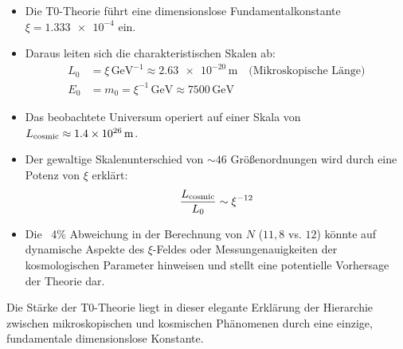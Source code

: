 \documentclass[12pt,a4paper]{article}
\begin{document}
	\begin{itemize}
		\item Die T0-Theorie führt eine dimensionslose Fundamentalkonstante $\xi = \num{1,333e-4}$ ein.
		\item Daraus leiten sich die charakteristischen Skalen ab:
		\begin{align*}
			L_0 &= \xi \, \text{GeV}^{-1} \approx \num{2,63e-20} \, \text{m} \quad \text{(Mikroskopische Länge)} \\
			E_0 &= m_0 = \xi^{-1} \, \text{GeV} \approx 7500 \, \text{GeV}
		\end{align*}
		\item Das beobachtete Universum operiert auf einer Skala von $L_{\rm cosmic} \approx \num{1,4e26} \, \text{m}$.
		\item Der gewaltige Skalenunterschied von $\sim 46$ Größenordnungen wird durch eine Potenz von $\xi$ erklärt:
		\[
		\frac{L_{\rm cosmic}}{L_0} \sim \xi^{-12}
		\]
		\item Die ~4\% Abweichung in der Berechnung von $N$ ($11,8$ vs. $12$) könnte auf dynamische Aspekte des $\xi$-Feldes oder Messungenauigkeiten der kosmologischen Parameter hinweisen und stellt eine potentielle Vorhersage der Theorie dar.
	\end{itemize}
	
	Die Stärke der T0-Theorie liegt in dieser elegante Erklärung der Hierarchie zwischen mikroskopischen und kosmischen Phänomenen durch eine einzige, fundamentale dimensionslose Konstante.
	
\end{document}
